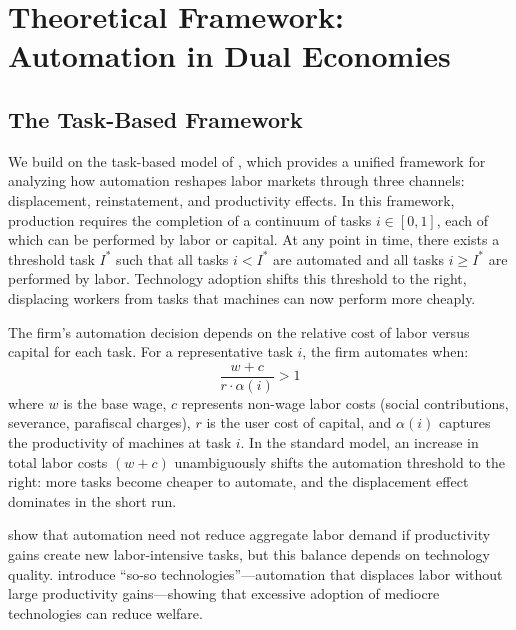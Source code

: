 \documentclass[5p,times,authoryear]{elsarticle}
\begin{document}
\FloatBarrier


\section{Theoretical Framework: Automation in Dual Economies}
\label{sec:theory}

\subsection{The Task-Based Framework}
\label{subsec:task_model}

We build on the task-based model of \citet{acemoglu2019automation}, which provides a unified framework for analyzing how automation reshapes labor markets through three channels: displacement, reinstatement, and productivity effects. In this framework, production requires the completion of a continuum of tasks $i \in [0,1]$, each of which can be performed by labor or capital. At any point in time, there exists a threshold task $I^*$ such that all tasks $i < I^*$ are automated and all tasks $i \geq I^*$ are performed by labor. Technology adoption shifts this threshold to the right, displacing workers from tasks that machines can now perform more cheaply.

The firm's automation decision depends on the relative cost of labor versus capital for each task. For a representative task $i$, the firm automates when:
\begin{equation}
\label{eq:automation_threshold}
\frac{w + c}{r \cdot \alpha(i)} > 1
\end{equation}
where $w$ is the base wage, $c$ represents non-wage labor costs (social contributions, severance, parafiscal charges), $r$ is the user cost of capital, and $\alpha(i)$ captures the productivity of machines at task $i$. In the standard model, an increase in total labor costs $(w + c)$ unambiguously shifts the automation threshold to the right: more tasks become cheaper to automate, and the displacement effect dominates in the short run.

\citet{acemoglu2022tasks} show that automation need not reduce aggregate labor demand if productivity gains create new labor-intensive tasks, but this balance depends on technology quality. \citet{acemoglu2020taxes} introduce ``so-so technologies''---automation that displaces labor without large productivity gains---showing that excessive adoption of mediocre technologies can reduce welfare.
\end{document}

